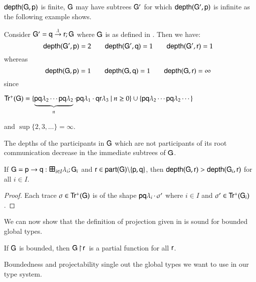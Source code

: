  ${\sf depth}({\sf G},{\sf p})$ is finite, ${\sf G}$ may have subtrees ${\sf G}'$ for which
 ${\sf depth}({\sf G}',{\sf p})$ is  infinite 
as the following example shows.
 \begin{example}
Consider ${\sf G}'= {\sf q}\stackrel{\lambda}{\to}{\sf r};{\sf G}$  where
 ${\sf G}$ is as defined in . 
 Then we have: 
\[
 {\sf depth}({\sf G}',{\sf p})=2\quad\quad {\sf depth}({\sf G}',{\sf q})=1\quad\quad{\sf depth}({\sf G}',{\sf r})=1
 \]
 whereas
\[
 {\sf depth}({\sf G},{\sf p})=1\quad\quad {\sf depth}({\sf G},{\sf q})=1\quad\quad{\sf depth}({\sf G},{\sf r})=\infty
 \]
  since\\ \centerline{$\FPaths{\G}=\{\underbrace{\Comm\pp{\la_2}\q\cdots \Comm\pp{\la_2}\q}_n\cdot\Comm\pp{\la_1}\q\cdot\Comm\q{\la_3}\pr\ |\ n\geq 0\}
 \cup\{\Comm\pp{\la_2}\q\cdots\Comm\pp{\la_2}\q\cdots\} $ }  and
  $\sup\{2,3,\ldots\} = \infty$. 
 \end{example}
 
The depths of the participants  in  ${\sf G}$
which are not participants of its root communication decrease in the immediate subtrees of ${\sf G}$.  

\begin{proposition}\label{dd}
If $\G=\gt\pp\q i I \la \G$ and ${\sf r}\in{\sf part}({\sf G}){\setminus}\{{\sf p},{\sf q}\}$, then ${\sf depth}({\sf G},{\sf r})>{\sf depth}({\sf G}_i,{\sf r})$ for all $i\in I$.
\end{proposition}
\begin{proof}
Each trace $\sigma\in{\sf Tr^+}({\sf G})$ is of the shape ${\sf p}{\sf q}\lambda_i\,{\cdot}\,\sigma'$ where $i\in I$ and $\sigma'\in{\sf Tr^+}({\sf G}_i)$. 
\end{proof}

We can now show that the definition of projection given in
 is sound  for bounded global types. 
 
\begin{lemma}\label{pf}
If ${{\sf G}}$ is bounded, then ${{\sf G}} \! \upharpoonright \! {\sf r}\,$ is a partial function for all ${\sf r}$.  
\end{lemma}

Boundedness and projectability single out the global types we want to use in
our type system.

